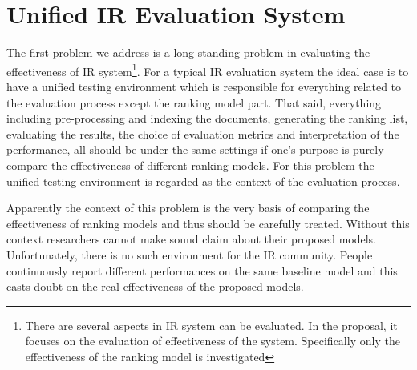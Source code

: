 \section{Unified IR Evaluation System}
The first problem we address is a long standing problem in evaluating the 
effectiveness of IR system\footnote{There are several aspects in IR system 
can be evaluated. In the proposal, it focuses on the evaluation of 
effectiveness of the system. Specifically only the effectiveness of the 
ranking model is investigated}. 
For a typical IR evaluation system the ideal case is to have a unified 
testing environment which is responsible for everything related 
to the evaluation process except the ranking model part. That said, everything 
including pre-processing and indexing the documents, generating the ranking 
list, evaluating the results, the choice of evaluation metrics and 
interpretation of the performance, all should be under the same settings 
if one's purpose is purely compare the effectiveness of different ranking models.
For this problem the unified testing environment is regarded as the context of 
the evaluation process. 

Apparently the context of this problem is the very basis of comparing the 
effectiveness of ranking models and thus should be carefully treated. 
Without this context researchers cannot make sound claim about 
their proposed models. Unfortunately, there is no such environment for the 
IR community. People continuously report different performances on the same 
baseline model \cite{Yang:2016:RSI:2970398.2970415} and this casts doubt on 
the real effectiveness of the proposed models.

